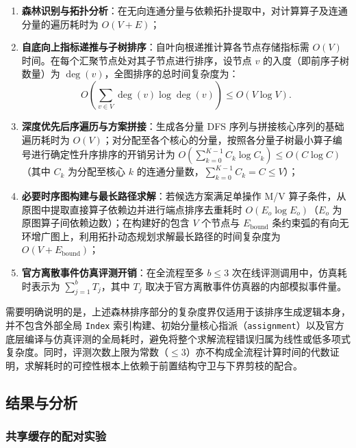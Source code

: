 \documentclass[anonymous,withtoc]{gmcm2026}
\providecommand{\tightlist}{\setlength{\itemsep}{0pt}\setlength{\parskip}{0pt}}
\begin{document}
\begin{enumerate}
\def\labelenumi{\arabic{enumi}.}
\tightlist
\item
  \textbf{森林识别与拓扑分析}：在无向连通分量与依赖拓扑提取中，对计算算子及连通分量的遍历耗时为 \(O(V + E)\)；
\item
  \textbf{自底向上指标递推与子树排序}：自叶向根递推计算各节点存储指标需 \(O(V)\) 时间。在每个汇聚节点处对其子节点进行排序，设节点 \(v\) 的入度（即前序子树数量）为 \(\deg(v)\)，全图排序的总时间复杂度为： \begin{equation}
O\left( \sum_{v \in V} \deg(v) \log \deg(v) \right) \le O(V \log V).
\end{equation}
\item
  \textbf{深度优先后序遍历与方案拼接}：生成各分量 DFS 序列与拼接核心序列的基础遍历耗时为 \(O(V)\)；对分配至各个核心的分量，按照各分量子树最小算子编号进行确定性升序排序的开销另计为 \(O\left(\sum_{k=0}^{K-1} C_k \log C_k\right) \le O(C \log C)\)（其中 \(C_k\) 为分配至核心 \(k\) 的连通分量数，\(\sum_{k=0}^{K-1} C_k = C \le V\)）；
\item
  \textbf{必要时序图构建与最长路径求解}：若候选方案满足单操作 M/V 算子条件，从原图中提取直接算子依赖边并进行端点排序去重耗时 \(O(E_o \log E_o)\)（\(E_o\) 为原图算子间依赖边数）；在构建好的包含 \(V\) 个节点与 \(E_{\mathrm{bound}}\) 条约束弧的有向无环增广图上，利用拓扑动态规划求解最长路径的时间复杂度为 \(O(V + E_{\mathrm{bound}})\)；
\item
  \textbf{官方离散事件仿真评测开销}：在全流程至多 \(b \le 3\) 次在线评测调用中，仿真耗时表示为 \(\sum_{j=1}^b T_j\)，其中 \(T_j\) 取决于官方离散事件仿真器的内部模拟事件量。
\end{enumerate}

需要明确说明的是，上述森林排序部分的复杂度界仅适用于该排序生成逻辑本身，并不包含外部全局 \texttt{Index} 索引构建、初始分量核心指派（\texttt{assignment}）以及官方底层编译与仿真评测的全局耗时，避免将整个求解流程错误归属为线性或低多项式复杂度。同时，评测次数上限为常数（\(\le 3\)）亦不构成全流程计算时间的代数证明，求解耗时的可控性根本上依赖于前置结构守卫与下界剪枝的配合。

\subsection{结果与分析}

\subsubsection{共享缓存的配对实验}
\end{document}
